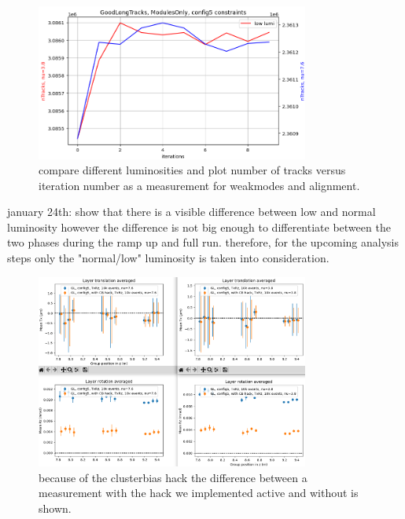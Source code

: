 \begin{figure}
  \centering
  \includegraphics[width=0.8\textwidth]{plots/jan_17_2022/tracks_vs_iterations_modulesOnly.png}
  \caption{compare different luminosities and plot number of tracks versus iteration number as a measurement for weakmodes and alignment.}
  \label{fig:chi2iter_lumi_normal}
\end{figure}

january 24th: show that there is a visible difference between low and normal luminosity however the difference is not big enough to differentiate between the two phases during the ramp up and full run. therefore, for the upcoming analysis steps only the "normal/low" luminosity is taken into consideration.

\begin{figure}
  \centering
  \includegraphics[width=0.8\textwidth]{plots/jan_24_2022/compare_with_without_hack.png}
  \caption{because of the clusterbias hack the difference between a measurement with the hack we implemented active and without is shown.}
  \label{fig:cbhack_on_off}
\end{figure}

